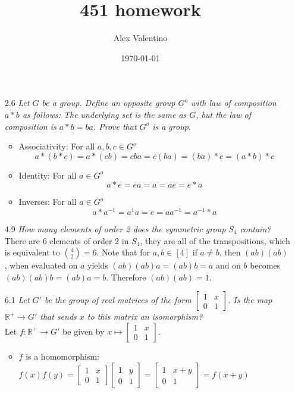 \documentclass[12pt, letterpaper]{article}
\date{\today}
\author{Alex Valentino}
\title{451 homework}
\newcommand{\R}{\mathbb{R}}
\begin{document}
\begin{enumerate}
	\item[2.6]\textit{Let $G$ be a group. Define an opposite group $G^o$ with law of composition $a * b$ as follows:
The underlying set is the same as $G$, but the law of composition is $a * b = ba$. Prove that $G^o$ is a group.}\\
	\begin{itemize}
		\item Associativity: For all $a,b,c \in G^o$
		$$
		a * (b*c) = a*(cb) = cba = c(ba) = (ba) * c = (a*b)*c
		$$
		\item Identity: For all $a \in G^o$ 
		$$
			a*e = ea = a = ae = e * a 
		$$
		\item Inverses:  For all $a \in G^o$
		$$a * a^{-1} = a^{1}a = e = a a^{-1} = a^{-1} * a$$
	\end{itemize}
	\item[4.9]\textit{How many elements of order 2 does the symmetric group $S_4$ contain?}\\
	There are 6 elements of order 2 in $S_4$, they are all of the 
	transpositions, which is equivalent to $\binom{4}{2} = 6$.
	Note that for $a, b \in [4]$ if $a\neq b$, then $(ab)(ab)$, when evaluated on $a$ yields $(ab)(ab)a = (ab)b = a$ and on $b$ becomes
	$(ab)(ab)b = (ab)a = b$.  Therefore $(ab)(ab) = 1$.  
	\item[6.1]\textit{Let $G'$ be the group of real matrices of the form
	$\begin{bmatrix}1 & x\\ 0 & 1\end{bmatrix}$.  Is the map $\R^+ \to G'$ that sends $x$ to this matrix an isomorphism?	}\\
	Let $f : \R^+ \to G'$ be given by $x \mapsto \begin{bmatrix}1 & x\\ 0 & 1\end{bmatrix}$.
	\begin{itemize}
		\item $f$ is a homomorphism:\\
		$f(x)f(y) = \begin{bmatrix}1 & x\\ 0 & 1\end{bmatrix} \begin{bmatrix}1 & y\\ 0 & 1\end{bmatrix} = \begin{bmatrix}1 & x+y\\ 0 & 1\end{bmatrix} = f(x+y)$

\end{itemize}
\end{enumerate}
\end{document}
